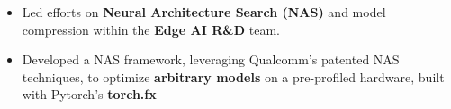 \documentclass[10pt,a4paper,ragged2e,withhyper]{altacv}
\begin{document}

\begin{paracol}{2}


    \makecvheader{}




    \begin{itemize}
        \item Led efforts on \textbf{Neural Architecture Search (NAS)} and model compression within the \textbf{Edge AI R\&D} team.

        \item Developed a NAS framework, leveraging Qualcomm's patented NAS
              techniques, to optimize \textbf{arbitrary models} on a pre-profiled hardware, built with Pytorch's
              \textbf{torch.fx}


\end{itemize}
\end{paracol}
\end{document}
